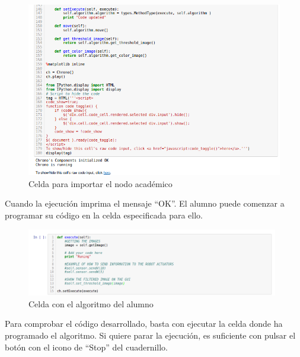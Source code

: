 \begin{figure}[H]
\begin{minipage}[h]{.48\linewidth}
	\end{minipage}
    \begin{minipage}[h]{.48\linewidth}
    \centering
    \includegraphics[width=0.98\linewidth]{figures/celda_nodo_chrono3.png}
	\end{minipage}
    \caption{Celda para importar el nodo académico}
		\label{fig.cnach}
\end{figure}


Cuando la ejecución imprima el mensaje ``OK''. El alumno puede comenzar a programar su código en la celda especificada para ello.

\begin{figure}[H]
  \begin{center}
    \includegraphics[width=0.98\textwidth]{figures/celda_solucion_chrono.png}
		\caption{Celda con el algoritmo del alumno}
		\label{fig.ccach}
		\end{center}
\end{figure}

Para comprobar el código desarrollado, basta con ejecutar la celda donde ha programado el algoritmo. Si quiere parar la ejecución, es suficiente con pulsar el botón con el icono de ``Stop'' del cuadernillo.

